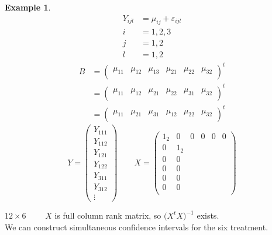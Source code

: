 \documentclass[11pt,a4paper]{article}
\theoremstyle{definition}
\newtheorem{exa}[thm]{Example}
\begin{document}
\begin{exa}
\begin{align*}
Y_{ijl} & = \mu_{ij} + \varepsilon_{ijl}\\
i & = 1,2,3\\
j & = 1,2\\
l & = 1,2
\end{align*}
\begin{align*}
B & = 
\begin{pmatrix}
\mu_{11} & \mu_{12} & \mu_{13} & \mu_{21} & \mu_{22} & \mu_{32}\\
\end{pmatrix}^t\\
& = 
\begin{pmatrix}
\mu_{11} & \mu_{12} & \mu_{21} & \mu_{22} & \mu_{31} & \mu_{32}\\
\end{pmatrix}^t\\
& = 
\begin{pmatrix}
\mu_{11} & \mu_{21} & \mu_{31} & \mu_{12} & \mu_{22} & \mu_{32}\\
\end{pmatrix}^t
\end{align*}
$$Y=
\begin{pmatrix}
Y_{111}\\
Y_{112}\\
\hline
Y_{121}\\
Y_{122}\\
\hline
Y_{311}\\
Y_{312}\\
\hline
\vdots
\end{pmatrix}
\qquad 
X=
\begin{pmatrix}
1_2 & 0 & 0 & 0 & 0 & 0\\
0   & 1_2\\
0   & 0  \\
0   & 0\\
0   & 0\\
0   & 0\\
\end{pmatrix}
$$

$12\times 6$ $\qquad  X$ is full column rank matrix, so $\big(X^tX\big)^{-1}$ exists.\\

We can construct simultaneous confidence intervals for the six treatment.\\



\end{exa}
\end{document}
